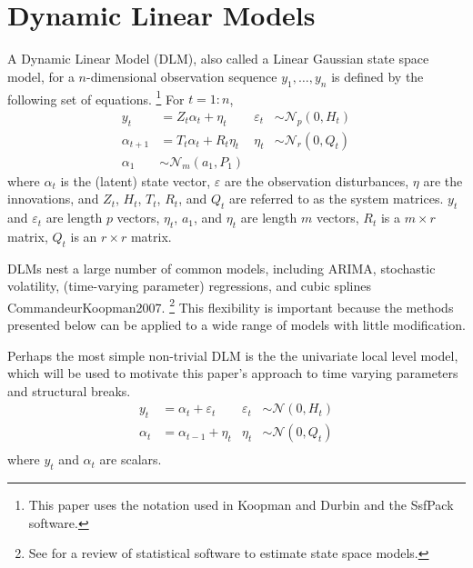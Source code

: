 \documentclass{article}
\newcommand{\paren}[1]{\ensuremath{\left(#1\right)}}
\newcommand{\dnorm}[1]{\ensuremath{\mathcal{N}\paren{#1}}}
\newcommand{\dmvnorm}[2]{\ensuremath{\mathcal{N}_{#2}\paren{#1}}}
\begin{document}
\section{Dynamic Linear Models}

A Dynamic Linear Model (DLM), also called a Linear Gaussian state space model, for a $n$-dimensional observation sequence $y_{1}, \dots, y_{n}$ is defined by the following set of equations.%
\footnote{This paper uses the notation used in Koopman and Durbin and the SsfPack software.}
For $t = 1:n$,
\begin{align}
  \label{eq:8}
  y_t &= Z_{t} \alpha_t + \eta_t & \varepsilon_{t} &\sim \dmvnorm{0, H_{t}}{p} \\
  \label{eq:14}
  \alpha_{t+1} &= T_{t} \alpha_{t} + R_{t} \eta_{t} & \eta_{t} &\sim \dmvnorm{0, Q_{t}}{r} \\
  \label{eq:2}
  \alpha_{1} & \sim \dmvnorm{a_{1}, P_{1}}{m}
\end{align}
where $\alpha_{t}$ is the (latent) state vector, 
$\varepsilon$ are the observation disturbances, 
$\eta$ are the innovations, 
and $Z_{t}$, $H_{t}$, $T_{t}$, $R_{t}$, and $Q_{t}$ are referred to as the system matrices.
$y_{t}$ and $\varepsilon_{t}$ are length $p$ vectors,
$\eta_{t}$, $a_{1}$, and $\eta_{t}$ are length $m$ vectors,
$R_{t}$ is a $m \times r$ matrix, $Q_{t}$ is an $r \times r$ matrix.

DLMs nest a large number of common models, including ARIMA, stochastic volatility, (time-varying parameter) regressions,
and cubic splines \parencites{WestHarrison1997}{DurbinKoopman2001}\parencite{PetrisPetroneEtAl2009}{CommandeurKoopman2007}.%
\footnote{See \textcite{CommandeurKoopmanOoms2011} for a review of statistical software to estimate state space models.}
This flexibility is important because the methods presented below can be applied to a wide range of models with little modification.

Perhaps the most simple non-trivial DLM is the the univariate local level model, which will be used to motivate this paper's approach to time varying parameters and structural breaks.
\begin{align}
  \label{eq:15}
  y_t &= \alpha_t + \varepsilon_t & \varepsilon_{t} &\sim \dnorm{0, H_{t}} \\
  \label{eq:16}
  \alpha_t &= \alpha_{t-1} + \eta_{t} & \eta_{t} &\sim \dnorm{0, Q_{t}} \\
\end{align}
where $y_{t}$ and $\alpha_{t}$ are scalars.
\end{document}
